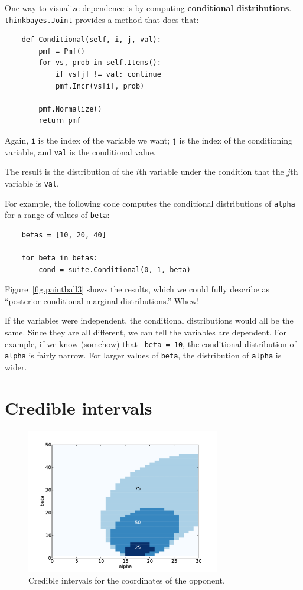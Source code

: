 \documentclass[12pt]{book}
\begin{document}
One way to visualize dependence is by computing {\bf conditional
distributions}.  {\tt thinkbayes.Joint} provides a method that
does that:

\begin{verbatim}
    def Conditional(self, i, j, val):
        pmf = Pmf()
        for vs, prob in self.Items():
            if vs[j] != val: continue
            pmf.Incr(vs[i], prob)

        pmf.Normalize()
        return pmf
\end{verbatim}

Again, {\tt i} is the index of the variable we want; {\tt j}
is the index of the conditioning variable, and {\tt val} is the
conditional value.

The result is the distribution of the $i$th variable under the
condition that the $j$th variable is {\tt val}.

For example, the following code computes the conditional distributions
of {\tt alpha} for a range of values of {\tt beta}:

\begin{verbatim}
    betas = [10, 20, 40]

    for beta in betas:
        cond = suite.Conditional(0, 1, beta)
\end{verbatim}

Figure~\ref{fig.paintball3} shows the results, which we could
fully describe as ``posterior conditional marginal distributions.''
Whew!

If the variables were independent, the conditional distributions would
all be the same.  Since they are all different, we can tell the
variables are dependent.  For example, if we know (somehow) that {\tt
  beta = 10}, the conditional distribution of {\tt alpha} is fairly
narrow.  For larger values of {\tt beta}, the distribution of
{\tt alpha} is wider.


\section{Credible intervals}

\begin{figure}
\centerline{\includegraphics[height=2.5in]{figs/paintball5.pdf}}
\caption{Credible intervals for the coordinates of the opponent.}
\label{fig.paintball5}
\end{figure}
\end{document}
